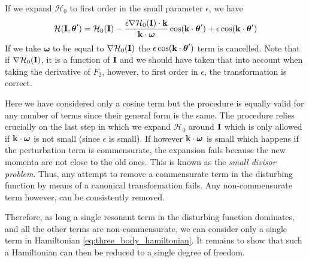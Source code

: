 \documentclass[twoside,openright,titlepage,numbers=noenddot,headinclude,%
                footinclude=true,cleardoublepage=empty,abstractoff, 
                BCOR=5mm,paper=a4,fontsize=11pt,%
                american,%
                ]{scrreprt}%
\begin{document}
If we expand $\mathcal{H}_0$ to first order in the small parameter 
$\epsilon$, we have
\begin{equation}
    \mathcal{H}(\boldsymbol{\mathbf{I}},\boldsymbol{\theta}')=\mathcal{H}_0(\boldsymbol{\mathbf{I}})
    - \frac{\epsilon\nabla \mathcal{H}_0(\boldsymbol{\mathbf{I}})\cdot\boldsymbol{\mathbf{k}}}{
        \boldsymbol{\mathbf{k}}\cdot\boldsymbol{\omega}} \cos(\boldsymbol{\mathbf{k}}\cdot
    \boldsymbol{\theta}')+\epsilon\cos(\boldsymbol{\mathbf{k}}\cdot\boldsymbol{\theta}')
\end{equation}
If we take $\boldsymbol{\omega}$ to be equal to $\nabla\mathcal{H}_0(\boldsymbol{\mathbf{I}})$
the $\epsilon\cos(\boldsymbol{\mathbf{k}}\cdot\boldsymbol{\theta}')$ term is cancelled. Note
that if $\nabla\mathcal{H}_0(\boldsymbol{\mathbf{I}})$, it is a function of $\boldsymbol{\mathbf{I}}$ and 
we should have taken that into account when taking the derivative of $F_2$, 
however, to first order in $\epsilon$, the transformation is correct.

Here we have 
considered only a cosine term but the procedure is equally valid for any
number of terms since their general form is the same. The procedure 
relies crucially on the last step in which we expand $\mathcal{H}_0$ around
$\boldsymbol{\mathbf{I}}$ which is only allowed if $\boldsymbol{\mathbf{k}}\cdot\boldsymbol{\omega}$ is not
small (since $\epsilon$ is small). If however $\boldsymbol{\mathbf{k}}\cdot\boldsymbol{\omega}$
is small which happens if the perturbation term is commensurate, the expansion
fails because the new momenta are not close to the old ones. This is known
as the \emph{small divisor problem}. Thus, any attempt to remove a 
commensurate term in the disturbing function by means of a canonical transformation
fails. Any non-commensurate term however, can be consistently removed.

Therefore, as long a single resonant term in the disturbing function dominates, and
all the other terms are non-commensurate, we can consider only a single term
in Hamiltonian \ref{eq:three_body_hamiltonian}. It remains to show that 
such a Hamiltonian can then be reduced to a single degree of freedom.
\end{document}
